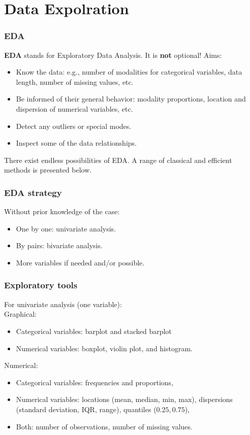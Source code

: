 \section{Data Expolration}
\begin{frame}
\frametitle{EDA}
{\bf EDA} stands for Exploratory Data Analysis. It is {\bf not} optional! Aims:
\begin{itemize}
\item Know the data: e.g., number of modalities for categorical variables, data length, number of missing values, etc.
\item Be informed of their general behavior: modality proportions, location and dispersion of numerical variables, etc.
\item Detect any outliers or special modes.
\item Inspect some of the data relationships.
\end{itemize}
There exist endless possibilities of EDA. A range of classical and efficient methods is presented below.
\end{frame}
\begin{frame}
\frametitle{EDA strategy}
Without prior knowledge of the case:
\begin{itemize}
\item One by one: univariate analysis.
\item By pairs: bivariate analysis. 
\item More variables if needed and/or possible.
\end{itemize}
\end{frame}
\begin{frame}
\frametitle{Exploratory tools}
For univariate analysis (one variable):\\
\vspace{0.3cm}
Graphical:
\begin{itemize}
\item Categorical variables: barplot and stacked barplot
\item Numerical variables: boxplot, violin plot, and histogram.
\end{itemize}
Numerical:
\begin{itemize}
\item Categorical variables: frequencies and proportions,
\item Numerical variables: locations (mean, median, min, max), dispersions (standard deviation, IQR, range), quantiles ($0.25, 0.75$),
\item Both: number of observations, number of missing values.
\end{itemize}
\end{frame}

